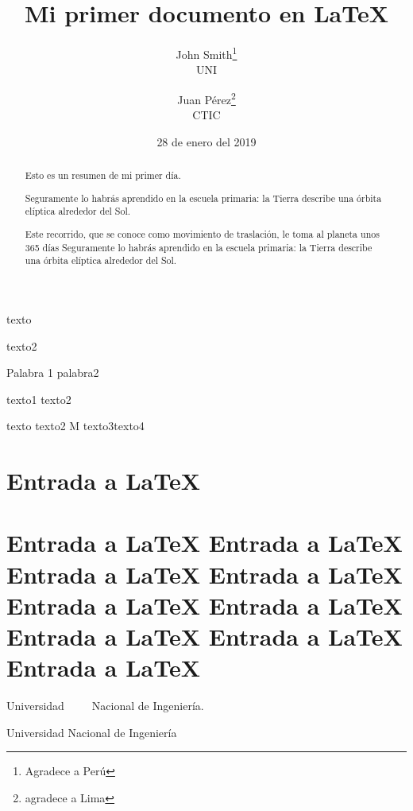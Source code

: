 \documentclass[12pt,a4paper]{article}
\title{Mi primer documento en LaTeX}
\author{John Smith\thanks{Agradece a Perú}\\UNI \and Juan Pérez\thanks{agradece a Lima}\\CTIC }
\date{28 de enero del 2019}
\begin{document}
\maketitle

\thispagestyle{empty}

\begin{abstract}
Esto es un resumen de mi primer día.

 Seguramente lo habrás aprendido en la escuela primaria: la Tierra describe una órbita elíptica alrededor del Sol.

Este recorrido, que se conoce como movimiento de traslación, le toma al planeta unos 365 días  Seguramente lo habrás aprendido en la escuela primaria: la Tierra describe una órbita elíptica alrededor del Sol.

 
\end{abstract}
	
\tableofcontents

\newpage


texto 

\vspace{4cm}

texto2

\newpage

\vspace*{5cm}
Palabra 1 palabra2


\hspace*{4cm} texto1\hspace{2cm} texto2

texto \quad texto2 M texto3\qquad texto4

	
\section*{Entrada a LaTeX}

\clearpage
	
\section[Entrada a LaTeX]{Entrada a LaTeX Entrada a LaTeX Entrada a LaTeX Entrada a LaTeX Entrada a LaTeX Entrada a LaTeX Entrada a LaTeX Entrada a LaTeX Entrada a LaTeX}\label{sec1}	

Universidad\ \ \ \ \     Nacional de Ingeniería.	\\

\begin{center}
	Universidad Nacional de Ingeniería
\end{center}
\end{document}
